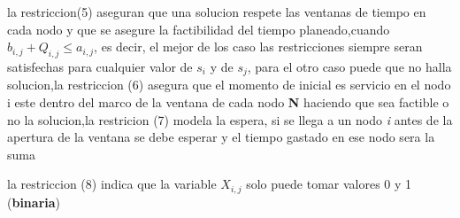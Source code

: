 \documentclass[journal, a4paper]{IEEEtran}
\begin{document}
la restriccion(5) aseguran que una solucion respete las ventanas de tiempo en cada nodo y que
se asegure la factibilidad del tiempo planeado,cuando \( b_{i,j} + Q_{i,j} \leq a_{i,j} \), es decir,
el mejor de los caso las restricciones siempre seran satisfechas para cualquier 
valor de \( s_{i}\)  y de \(s_{j}\), para el otro caso puede que no halla solucion,la restriccion (6) asegura que 
el momento de inicial es servicio en el nodo i este dentro del marco de la ventana de cada nodo \textbf{N} haciendo que sea 
factible o no la solucion,la restricion (7) modela la espera, si se llega a un nodo \textit{i} antes de la apertura de la
ventana se debe esperar y el tiempo gastado en ese nodo sera la suma 

la restriccion (8) indica que la variable \(X_{i,j}\) solo puede tomar valores 0 y 1 (\textbf{binaria})
\end{document}
